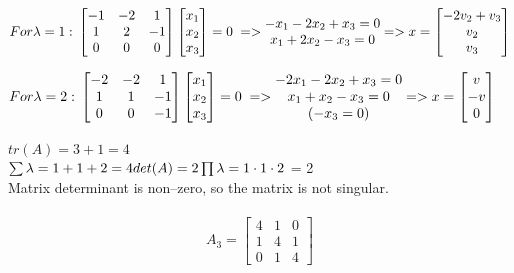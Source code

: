 \documentclass[eng,openany]{mgr}
\begin{document}
\begin{math}
For \lambda = 1:\\
\begin{bmatrix}
-1 & -2 & 1  \\
1 & 2 & -1 \\
0 & 0 & 0 
\end{bmatrix}
\begin{bmatrix}
x_1 \\
x_2 \\
x_3
\end{bmatrix}
= 0\; =>
\begin{matrix}
-x_1 -2x_2+x_3 = 0\\
x_1+2x_2-x_3 = 0\\

\end{matrix}
=>
x = 
\begin{bmatrix}
-2v_2+v_3\\
v_2 \\
v_3
\end{bmatrix}
\end{math}

\begin{math}
For \lambda = 2:\\
\begin{bmatrix}
-2 & -2 & 1  \\
1 & 1 & -1 \\
0 & 0 & -1 
\end{bmatrix}
\begin{bmatrix}
x_1 \\
x_2 \\
x_3
\end{bmatrix}
= 0\; =>
\begin{matrix}
-2x_1 -2x_2+x_3 = 0\\
x_1+x_2-x_3 = 0\\
(-x_3=0)
\end{matrix}
=>
x = 
\begin{bmatrix}
v\\
-v \\
0
\end{bmatrix}
\end{math}
\\ \\ 
$tr(A) = 3 +1 = 4$\\
$\sum \lambda = 1+1+2 = 4
\\ \\
det(A) = 2\\
\prod \lambda = 1 \cdot 1 \cdot 2$ = 2
\\
Matrix determinant is non--zero, so the matrix is not singular.
\\
\\
\[
A_3 =
\begin{bmatrix}
	4 & 1 & 0  \\
	1 & 4 & 1 \\
	0 & 1 & 4 
\end{bmatrix}
\]
\end{document}
